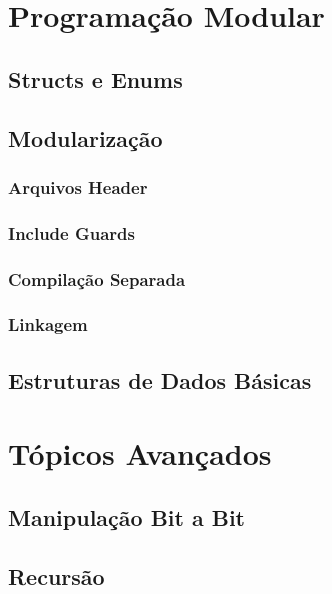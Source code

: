 \documentclass[12pt,a4paper,oneside]{extreport}
\begin{document}

\part{Programação Modular}

\chapter{Structs e Enums}

\chapter{Modularização}

\section{Arquivos Header}

\section{Include Guards}

\section{Compilação Separada}

\section{Linkagem}

\chapter{Estruturas de Dados Básicas}




\part{Tópicos Avançados}

\chapter{Manipulação Bit a Bit}

\chapter{Recursão}
\end{document}
